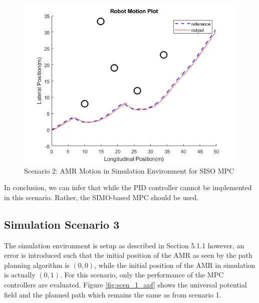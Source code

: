 \documentclass[a4paper, twocolumn]{article}
\begin{document}
\begin{figure}
    \centering
    \includegraphics[scale=0.40]{img/scenario_2/mpc1-robot_motion.png}
    \caption{Scenario 2: AMR Motion in Simulation Environment for SISO MPC}
    \label{fig:scen_2_mpc1_rob_mot}
\end{figure}


In conclusion, we can infer that while the PID controller cannot be implemented in this scenario. 
Rather, the SIMO-based MPC should be used. 


\subsection{Simulation Scenario 3}
The simulation environment is setup as described in Section 5.1.1 however, an error is introduced such that the initial position of the AMR as seen by the path planning 
algorithm is $(0,0)$, while the initial position of the AMR in simulation is actually $(0,1)$. 
For this scenario, only the performance of the MPC controllers are evaluated. 
Figure \ref{fig:scen_1_apf} shows the universal potential field and the planned path which remains the same as from scenario 1. 
\end{document}
